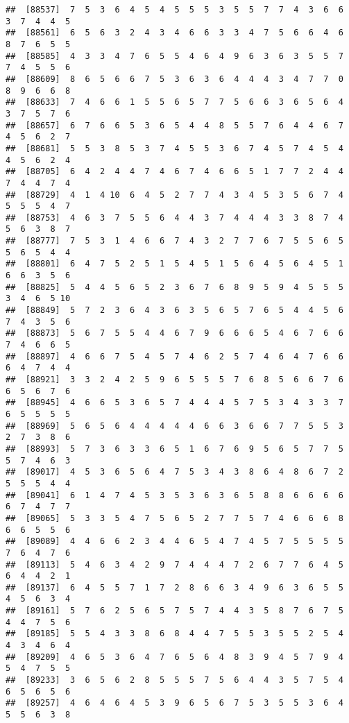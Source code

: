 \documentclass[
]{book}
\begin{document}
\begin{verbatim}
##  [88537]  7  5  3  6  4  5  4  5  5  5  3  5  5  7  7  4  3  6  6  3  7  4  4  5
##  [88561]  6  5  6  3  2  4  3  4  6  6  3  3  4  7  5  6  6  4  6  8  7  6  5  5
##  [88585]  4  3  3  4  7  6  5  5  4  6  4  9  6  3  6  3  5  5  7  7  4  5  5  6
##  [88609]  8  6  5  6  6  7  5  3  6  3  6  4  4  4  3  4  7  7  0  8  9  6  6  8
##  [88633]  7  4  6  6  1  5  5  6  5  7  7  5  6  6  3  6  5  6  4  3  7  5  7  6
##  [88657]  6  7  6  6  5  3  6  5  4  4  8  5  5  7  6  4  4  6  7  4  5  6  2  7
##  [88681]  5  5  3  8  5  3  7  4  5  5  3  6  7  4  5  7  4  5  4  4  5  6  2  4
##  [88705]  6  4  2  4  4  7  4  6  7  4  6  6  5  1  7  7  2  4  4  7  4  4  7  4
##  [88729]  4  1  4 10  6  4  5  2  7  7  4  3  4  5  3  5  6  7  4  5  5  5  4  7
##  [88753]  4  6  3  7  5  5  6  4  4  3  7  4  4  4  3  3  8  7  4  5  6  3  8  7
##  [88777]  7  5  3  1  4  6  6  7  4  3  2  7  7  6  7  5  5  6  5  5  6  5  4  4
##  [88801]  6  4  7  5  2  5  1  5  4  5  1  5  6  4  5  6  4  5  1  6  6  3  5  6
##  [88825]  5  4  4  5  6  5  2  3  6  7  6  8  9  5  9  4  5  5  5  3  4  6  5 10
##  [88849]  5  7  2  3  6  4  3  6  3  5  6  5  7  6  5  4  4  5  6  7  4  3  5  6
##  [88873]  5  6  7  5  5  4  4  6  7  9  6  6  6  5  4  6  7  6  6  7  4  6  6  5
##  [88897]  4  6  6  7  5  4  5  7  4  6  2  5  7  4  6  4  7  6  6  6  4  7  4  4
##  [88921]  3  3  2  4  2  5  9  6  5  5  5  7  6  8  5  6  6  7  6  6  5  6  7  6
##  [88945]  4  6  6  5  3  6  5  7  4  4  4  5  7  5  3  4  3  3  7  6  5  5  5  5
##  [88969]  5  6  5  6  4  4  4  4  4  6  6  3  6  6  7  7  5  5  3  2  7  3  8  6
##  [88993]  5  7  3  6  3  3  6  5  1  6  7  6  9  5  6  5  7  7  5  5  7  4  6  3
##  [89017]  4  5  3  6  5  6  4  7  5  3  4  3  8  6  4  8  6  7  2  5  5  5  4  4
##  [89041]  6  1  4  7  4  5  3  5  3  6  3  6  5  8  8  6  6  6  6  6  7  4  7  7
##  [89065]  5  3  3  5  4  7  5  6  5  2  7  7  5  7  4  6  6  6  8  6  6  5  5  6
##  [89089]  4  4  6  6  2  3  4  4  6  5  4  7  4  5  7  5  5  5  5  7  6  4  7  6
##  [89113]  5  4  6  3  4  2  9  7  4  4  4  7  2  6  7  7  6  4  5  6  4  4  2  1
##  [89137]  6  4  5  5  7  1  7  2  8  6  6  3  4  9  6  3  6  5  5  4  5  6  3  4
##  [89161]  5  7  6  2  5  6  5  7  5  7  4  4  3  5  8  7  6  7  5  4  4  7  5  6
##  [89185]  5  5  4  3  3  8  6  8  4  4  7  5  5  3  5  5  2  5  4  4  3  4  6  4
##  [89209]  4  6  5  3  6  4  7  6  5  6  4  8  3  9  4  5  7  9  4  5  4  7  5  5
##  [89233]  3  6  5  6  2  8  5  5  5  7  5  6  4  4  3  5  7  5  4  6  5  6  5  6
##  [89257]  4  6  4  6  4  5  3  9  6  5  6  7  5  3  5  5  3  6  4  5  5  6  3  8

\end{verbatim}
\end{document}
